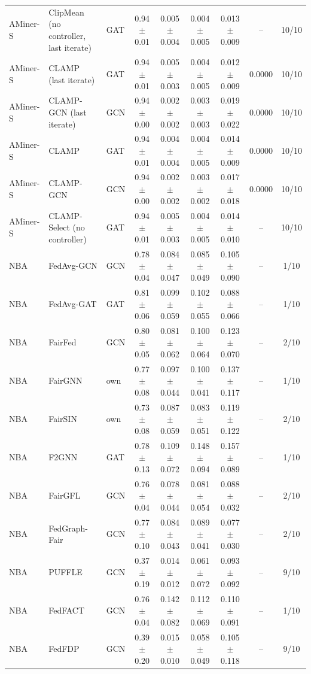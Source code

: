 \begin{longtable}{lp{3.2cm}lcccccc}
AMiner-S & ClipMean (no controller, last iterate) & GAT & 0.94$\pm$0.01 & 0.005$\pm$0.004 & 0.004$\pm$0.005 & 0.013$\pm$0.009 & -- & 10/10 \\
AMiner-S & CLAMP (last iterate) & GAT & 0.94$\pm$0.01 & 0.005$\pm$0.003 & 0.004$\pm$0.005 & 0.012$\pm$0.009 & 0.0000 & 10/10 \\
AMiner-S & CLAMP-GCN (last iterate) & GCN & 0.94$\pm$0.00 & 0.002$\pm$0.002 & 0.003$\pm$0.003 & 0.019$\pm$0.022 & 0.0000 & 10/10 \\
AMiner-S & CLAMP & GAT & 0.94$\pm$0.01 & 0.004$\pm$0.004 & 0.004$\pm$0.005 & 0.014$\pm$0.009 & 0.0000 & 10/10 \\
AMiner-S & CLAMP-GCN & GCN & 0.94$\pm$0.00 & 0.002$\pm$0.002 & 0.003$\pm$0.002 & 0.017$\pm$0.018 & 0.0000 & 10/10 \\
AMiner-S & CLAMP-Select (no controller) & GAT & 0.94$\pm$0.01 & 0.005$\pm$0.003 & 0.004$\pm$0.005 & 0.014$\pm$0.010 & -- & 10/10 \\
NBA & FedAvg-GCN & GCN & 0.78$\pm$0.04 & 0.084$\pm$0.047 & 0.085$\pm$0.049 & 0.105$\pm$0.090 & -- & 1/10 \\
NBA & FedAvg-GAT & GAT & 0.81$\pm$0.06 & 0.099$\pm$0.059 & 0.102$\pm$0.055 & 0.088$\pm$0.066 & -- & 1/10 \\
NBA & FairFed & GCN & 0.80$\pm$0.05 & 0.081$\pm$0.062 & 0.100$\pm$0.064 & 0.123$\pm$0.070 & -- & 2/10 \\
NBA & FairGNN & own & 0.77$\pm$0.08 & 0.097$\pm$0.044 & 0.100$\pm$0.041 & 0.137$\pm$0.117 & -- & 1/10 \\
NBA & FairSIN & own & 0.73$\pm$0.08 & 0.087$\pm$0.059 & 0.083$\pm$0.051 & 0.119$\pm$0.122 & -- & 2/10 \\
NBA & F2GNN & GAT & 0.78$\pm$0.13 & 0.109$\pm$0.072 & 0.148$\pm$0.094 & 0.157$\pm$0.089 & -- & 1/10 \\
NBA & FairGFL & GCN & 0.76$\pm$0.04 & 0.078$\pm$0.044 & 0.081$\pm$0.054 & 0.088$\pm$0.032 & -- & 2/10 \\
NBA & FedGraph-Fair & GCN & 0.77$\pm$0.10 & 0.084$\pm$0.043 & 0.089$\pm$0.041 & 0.077$\pm$0.030 & -- & 2/10 \\
NBA & PUFFLE & GCN & 0.37$\pm$0.19 & 0.014$\pm$0.012 & 0.061$\pm$0.072 & 0.093$\pm$0.092 & -- & 9/10 \\
NBA & FedFACT & GCN & 0.76$\pm$0.04 & 0.142$\pm$0.082 & 0.112$\pm$0.069 & 0.110$\pm$0.091 & -- & 1/10 \\
NBA & FedFDP & GCN & 0.39$\pm$0.20 & 0.015$\pm$0.010 & 0.058$\pm$0.049 & 0.105$\pm$0.118 & -- & 9/10 \\

\end{longtable}
